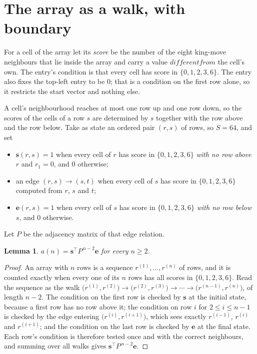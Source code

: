 \documentclass[11pt,a4paper]{article}
\theoremstyle{plain}
\newtheorem{lemma}[theorem]{Lemma}
\theoremstyle{definition}
\begin{document}
\section{The array as a walk, with boundary}

For a cell of the array let its \emph{score} be the number of the eight king-move neighbours that lie inside
the array and carry a value $different from$ the cell's own. The entry's condition is that every cell
has score in $\{0,1,2,3,6\}$. The entry also fixes the top-left entry to be $0$; that is a condition on the first row alone, so it restricts the start vector and nothing else.

A cell's neighbourhood reaches at most one row up and one row down, so the scores of the
cells of a row $s$ are determined by $s$ together with the row above and the row below.
Take as state an ordered pair $(r,s)$ of rows, so $S=64$, and set
\begin{itemize}
\item $\mathbf{s}(r,s)=1$ when every cell of $r$ has score in $\{0,1,2,3,6\}$ \emph{with no row
above $r$} and $r_1=0$, and $0$ otherwise;
\item an edge $(r,s)\to(s,t)$ when every cell of $s$ has score in $\{0,1,2,3,6\}$ computed from
$r$, $s$ and $t$;
\item $\mathbf{e}(r,s)=1$ when every cell of $s$ has score in $\{0,1,2,3,6\}$ \emph{with no row
below $s$}, and $0$ otherwise.
\end{itemize}
Let $P$ be the adjacency matrix of that edge relation.

\begin{lemma}\label{lem:walk}
$a(n)=\mathbf{s}^{\!\top}P^{\,n-2}\mathbf{e}$ for every $n\ge2$.
\end{lemma}

\begin{proof}
An array with $n$ rows is a sequence $r^{(1)},\dots,r^{(n)}$ of rows, and it is counted
exactly when every one of its $n$ rows has all scores in $\{0,1,2,3,6\}$. Read the sequence as the
walk $\bigl(r^{(1)},r^{(2)}\bigr)\to\bigl(r^{(2)},r^{(3)}\bigr)\to\cdots\to
\bigl(r^{(n-1)},r^{(n)}\bigr)$, of length $n-2$. The condition on the first row is
checked by $\mathbf{s}$ at the initial state, because a first row has no row above it; the
condition on row $i$ for $2\le i\le n-1$ is checked by the edge entering
$\bigl(r^{(i)},r^{(i+1)}\bigr)$, which sees exactly $r^{(i-1)}$, $r^{(i)}$ and
$r^{(i+1)}$; and the condition on the last row is checked by $\mathbf{e}$ at the final
state. Each row's condition is therefore tested once and with the correct neighbours, and
summing over all walks gives $\mathbf{s}^{\!\top}P^{\,n-2}\mathbf{e}$.
\end{proof}
\end{document}
